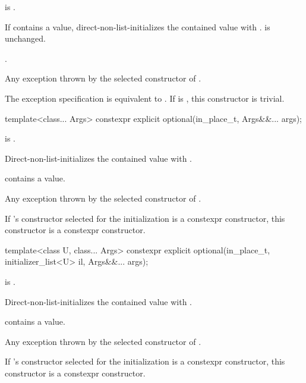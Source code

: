 \begin{itemdescr}
\pnum
\constraints
{} is .

\pnum
\effects
If  contains a value, direct-non-list-initializes the contained value
with .
 is unchanged.

\pnum
\ensures
{}.

\pnum
\throws
Any exception thrown by the selected constructor of .

\pnum
\remarks
The exception specification is equivalent to
.
If  is ,
this constructor is trivial.
\end{itemdescr}

%
\begin{itemdecl}
template<class... Args> constexpr explicit optional(in_place_t, Args&&... args);
\end{itemdecl}

\begin{itemdescr}
\pnum
\constraints
{} is .

\pnum
\effects
Direct-non-list-initializes the contained value with .

\pnum
\ensures
{} contains a value.

\pnum
\throws
Any exception thrown by the selected constructor of .

\pnum
\remarks
If 's constructor selected for the initialization is a constexpr constructor, this constructor is a constexpr constructor.
\end{itemdescr}

%
\begin{itemdecl}
template<class U, class... Args>
  constexpr explicit optional(in_place_t, initializer_list<U> il, Args&&... args);
\end{itemdecl}

\begin{itemdescr}
\pnum
\constraints
{} is .

\pnum
\effects
Direct-non-list-initializes the contained value with .

\pnum
\ensures
{} contains a value.

\pnum
\throws
Any exception thrown by the selected constructor of .

\pnum
\remarks
If 's constructor selected for the initialization is a constexpr constructor, this constructor is a constexpr constructor.
\end{itemdescr}

